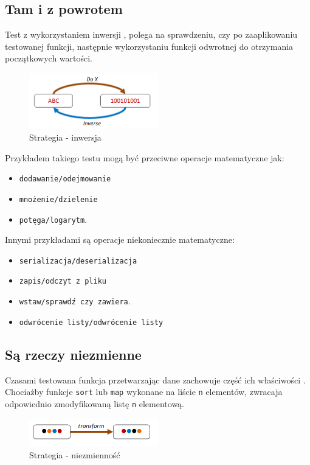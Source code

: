 \subsection{Tam i z powrotem}

Test z wykorzystaniem inwersji , polega na sprawdzeniu, czy po zaaplikowaniu testowanej funkcji, następnie wykorzystaniu funkcji odwrotnej do otrzymania początkowych wartości.   
\begin{figure}
    \centering
    \includegraphics[width=0.5\textwidth]{images/property_inverse.png}
    \caption{Strategia - inwersja}
    \label{fig:inverse_strategy}
\end{figure}
Przykładem takiego testu mogą być przeciwne operacje matematyczne jak:
\begin{itemize}
    \item \texttt{dodawanie/odejmowanie}
    \item \texttt{mnożenie/dzielenie}
    \item \texttt{potęga/logarytm}.
\end{itemize} 
Innymi przykładami są operacje niekoniecznie matematyczne:
\begin{itemize}
    \item \texttt{serializacja/deserializacja}
    \item \texttt{zapis/odczyt z pliku}
    \item \texttt{wstaw/sprawdź czy zawiera}.
    \item \texttt{odwrócenie listy/odwrócenie listy}
\end{itemize} 

\subsection{Są rzeczy niezmienne}

Czasami testowana funkcja przetwarzając dane zachowuje część ich właściwości . Chociażby funkcje \texttt{sort} lub \texttt{map} wykonane na liście \texttt{n} elementów, zwracaja odpowiednio zmodyfikowaną listę \texttt{n} elementową.

\begin{figure}
    \centering
    \includegraphics[width=0.5\textwidth]{images/property_invariant.png}
    \caption{Strategia - niezmienność}
    \label{fig:invariant_strategy}
\end{figure}

